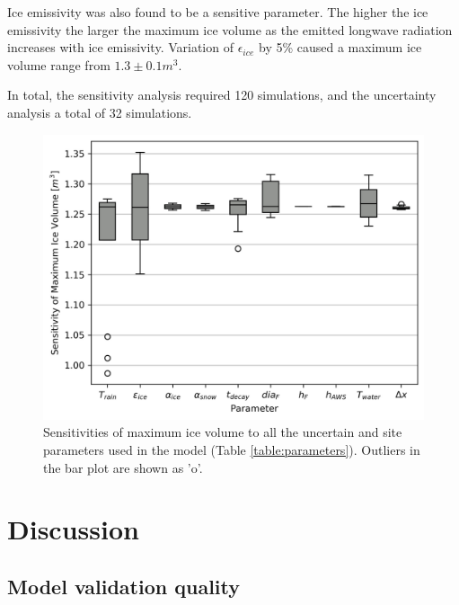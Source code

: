 \documentclass[utf8]{frontiersSCNS} %
\begin{document}
Ice emissivity was also found to be a sensitive parameter. The higher the ice emissivity the larger the maximum ice
volume as the emitted longwave radiation increases with ice emissivity. Variation of $\epsilon_{ice}$ by 5\% caused a
maximum ice volume range from $1.3 \pm 0.1 m^3$. 

In total, the sensitivity analysis required 120 simulations, and the uncertainty analysis a total of 32 simulations.

\begin{figure} \begin{center} \includegraphics[width=10 cm]{Figures/Figure_9.jpg} \end{center}
\caption{Sensitivities of maximum ice volume to all the uncertain and site parameters used in the model (Table
\ref{table:parameters}).  Outliers in the bar plot are shown as 'o'.} \label{fig:sensitivity} \end{figure}
\section{Discussion}

\subsection{Model validation quality}
\end{document}
